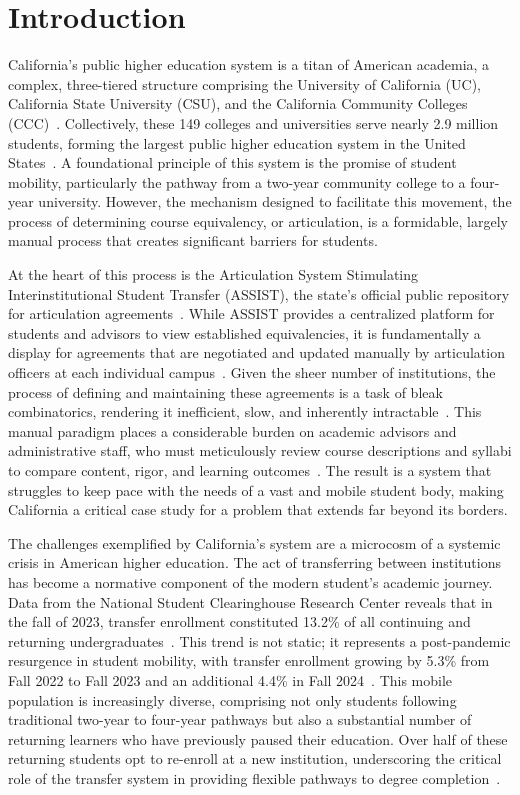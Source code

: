 \chapter{Introduction}

California's public higher education system is a titan of American academia, a complex, three-tiered structure comprising the University of California (UC), California State University (CSU), and the California Community Colleges (CCC)~\cite{ppic}. Collectively, these 149 colleges and universities serve nearly 2.9 million students, forming the largest public higher education system in the United States~\cite{ppic,uc,calstate,cccco}. A foundational principle of this system is the promise of student mobility, particularly the pathway from a two-year community college to a four-year university. However, the mechanism designed to facilitate this movement, the process of determining course equivalency, or articulation, is a formidable, largely manual process that creates significant barriers for students.

At the heart of this process is the Articulation System Stimulating Interinstitutional Student Transfer (ASSIST), the state's official public repository for articulation agreements~\cite{assistinfo}. While ASSIST provides a centralized platform for students and advisors to view established equivalencies, it is fundamentally a display for agreements that are negotiated and updated manually by articulation officers at each individual campus~\cite{assistfaq}. Given the sheer number of institutions, the process of defining and maintaining these agreements is a task of bleak combinatorics, rendering it inefficient, slow, and inherently intractable~\cite{pardos2019}. This manual paradigm places a considerable burden on academic advisors and administrative staff, who must meticulously review course descriptions and syllabi to compare content, rigor, and learning outcomes~\cite{pardos2019}. The result is a system that struggles to keep pace with the needs of a vast and mobile student body, making California a critical case study for a problem that extends far beyond its borders.

The challenges exemplified by California's system are a microcosm of a systemic crisis in American higher education. The act of transferring between institutions has become a normative component of the modern student's academic journey. Data from the National Student Clearinghouse Research Center reveals that in the fall of 2023, transfer enrollment constituted 13.2\% of all continuing and returning undergraduates~\cite{nscnews2023}. This trend is not static; it represents a post-pandemic resurgence in student mobility, with transfer enrollment growing by 5.3\% from Fall 2022 to Fall 2023 and an additional 4.4\% in Fall 2024~\cite{nscnews2023,nscnews20250305}. This mobile population is increasingly diverse, comprising not only students following traditional two-year to four-year pathways but also a substantial number of returning learners who have previously paused their education. Over half of these returning students opt to re-enroll at a new institution, underscoring the critical role of the transfer system in providing flexible pathways to degree completion~\cite{nscdd20250507}.

